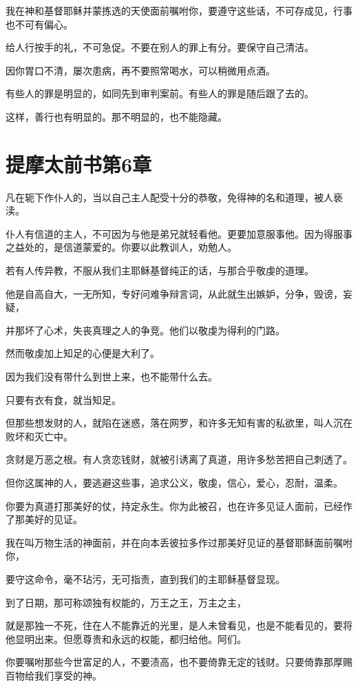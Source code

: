 \documentclass[12pt,oneside]{book}
\begin{document}
我在神和基督耶稣并蒙拣选的天使面前嘱咐你，要遵守这些话，不可存成见，行事也不可有偏心。

给人行按手的礼，不可急促。不要在别人的罪上有分。要保守自己清洁。

因你胃口不清，屡次患病，再不要照常喝水，可以稍微用点酒。

有些人的罪是明显的，如同先到审判案前。有些人的罪是随后跟了去的。

这样，善行也有明显的。那不明显的，也不能隐藏。

\chapter{提摩太前书第6章}
凡在轭下作仆人的，当以自己主人配受十分的恭敬，免得神的名和道理，被人亵渎。

仆人有信道的主人，不可因为与他是弟兄就轻看他。更要加意服事他。因为得服事之益处的，是信道蒙爱的。你要以此教训人，劝勉人。

若有人传异教，不服从我们主耶稣基督纯正的话，与那合乎敬虔的道理。

他是自高自大，一无所知，专好问难争辩言词，从此就生出嫉妒，分争，毁谤，妄疑，

并那坏了心术，失丧真理之人的争竞。他们以敬虔为得利的门路。

然而敬虔加上知足的心便是大利了。

因为我们没有带什么到世上来，也不能带什么去。

只要有衣有食，就当知足。

但那些想发财的人，就陷在迷惑，落在网罗，和许多无知有害的私欲里，叫人沉在败坏和灭亡中。

贪财是万恶之根。有人贪恋钱财，就被引诱离了真道，用许多愁苦把自己刺透了。

但你这属神的人，要逃避这些事，追求公义，敬虔，信心，爱心，忍耐，温柔。

你要为真道打那美好的仗，持定永生。你为此被召，也在许多见证人面前，已经作了那美好的见证。

我在叫万物生活的神面前，并在向本丢彼拉多作过那美好见证的基督耶稣面前嘱咐你，

要守这命令，毫不玷污，无可指责，直到我们的主耶稣基督显现。

到了日期，那可称颂独有权能的，万王之王，万主之主，

就是那独一不死，住在人不能靠近的光里，是人未曾看见，也是不能看见的，要将他显明出来。但愿尊贵和永远的权能，都归给他。阿们。

你要嘱咐那些今世富足的人，不要渍高，也不要倚靠无定的钱财。只要倚靠那厚赐百物给我们享受的神。
\end{document}
